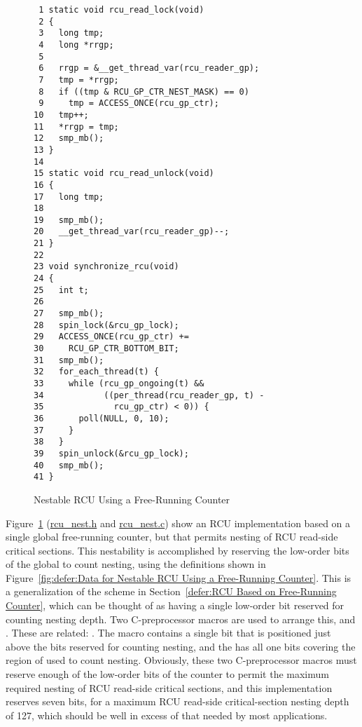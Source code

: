 \begin{figure}[tbp]
{ \scriptsize
\begin{verbatim}
 1 static void rcu_read_lock(void)
 2 {
 3   long tmp;
 4   long *rrgp;
 5 
 6   rrgp = &__get_thread_var(rcu_reader_gp);
 7   tmp = *rrgp;
 8   if ((tmp & RCU_GP_CTR_NEST_MASK) == 0)
 9     tmp = ACCESS_ONCE(rcu_gp_ctr);
10   tmp++;
11   *rrgp = tmp;
12   smp_mb();
13 }
14 
15 static void rcu_read_unlock(void)
16 {
17   long tmp;
18 
19   smp_mb();
20   __get_thread_var(rcu_reader_gp)--;
21 }
22 
23 void synchronize_rcu(void)
24 {
25   int t;
26 
27   smp_mb();
28   spin_lock(&rcu_gp_lock);
29   ACCESS_ONCE(rcu_gp_ctr) +=
30     RCU_GP_CTR_BOTTOM_BIT;
31   smp_mb();
32   for_each_thread(t) {
33     while (rcu_gp_ongoing(t) &&
34            ((per_thread(rcu_reader_gp, t) -
35              rcu_gp_ctr) < 0)) {
36       poll(NULL, 0, 10);
37     }
38   }
39   spin_unlock(&rcu_gp_lock);
40   smp_mb();
41 }
\end{verbatim}
}
\caption{Nestable RCU Using a Free-Running Counter}
\label{fig:defer:Nestable RCU Using a Free-Running Counter}
\end{figure}

Figure~\ref{fig:defer:Nestable RCU Using a Free-Running Counter}
(\url{rcu_nest.h} and \url{rcu_nest.c})
show an RCU implementation based on a single global free-running counter,
but that permits nesting of RCU read-side critical sections.
This nestability is accomplished by reserving the low-order bits of the
global  to count nesting, using the definitions shown in
Figure~\ref{fig:defer:Data for Nestable RCU Using a Free-Running Counter}.
This is a generalization of the scheme in
Section~\ref{defer:RCU Based on Free-Running Counter},
which can be thought of as having a single low-order bit reserved
for counting nesting depth.
Two C-preprocessor macros are used to arrange this,
 and
.
These are related: .
The  macro contains a single bit that is
positioned just above the bits reserved for counting nesting,
and the  has all one bits covering the
region of  used to count nesting.
Obviously, these two C-preprocessor macros must reserve enough
of the low-order bits of the counter to permit the maximum required
nesting of RCU read-side critical sections, and this implementation
reserves seven bits, for a maximum RCU read-side critical-section
nesting depth of 127, which should be well in excess of that needed
by most applications.

